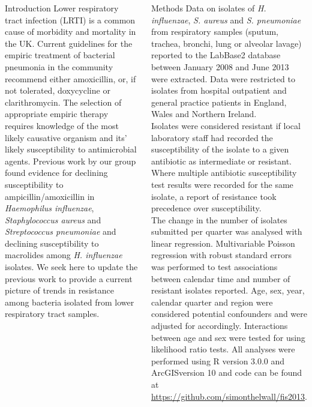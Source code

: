 \documentclass[final, 14pt]{beamer}
\begin{document}
\begin{frame}
\begin{columns}[t]
 \begin{minipage}[t]{.95\textwidth} %
  \begin{block}{Introduction}
  Lower respiratory tract infection (LRTI) is a common cause of morbidity and mortality in the UK. \citep{Davies2012}
   Current guidelines for the empiric treatment of bacterial pneumonia in the community recommend either amoxicillin, or, if not tolerated, doxycycline or clarithromycin. \citep{Lim2009}
   The selection of appropriate empiric therapy requires knowledge of the most likely causative organism and its' likely susceptibility to antimicrobial agents.
   Previous work by our group found evidence for declining susceptibility to ampicillin/amoxicillin in \textit{Haemophilus influenzae}, \textit{Staphylococcus aureus} and \textit{Streptococcus pneumoniae} and declining susceptibility to macrolides among \textit{H. influenzae} isolates. \citep{Blackburn2011}
   We seek here to update the previous work to provide a current picture of trends in resistance among bacteria isolated from lower respiratory tract samples. \\
   \end{block}
  
  \begin{block}{Methods}
Data on isolates of \textit{H. influenzae}, \textit{S. aureus} and \textit{S. pneumoniae} from respiratory samples (sputum, trachea, bronchi, lung or alveolar lavage) reported to the LabBase2 database between January 2008 and June 2013 were extracted. 
   Data were restricted to isolates from hospital outpatient and general practice patients in England, Wales and Northern Ireland.\\
   Isolates were considered resistant if local laboratory staff had recorded the susceptibility of the isolate to a given antibiotic as intermediate or resistant. 
   Where multiple antibiotic susceptibility test results were recorded for the same isolate, a report of resistance took precedence over susceptibility. \\
   The change in the number of isolates submitted per quarter was analysed with linear regression. 
   Multivariable Poisson regression with robust standard errors was performed to test associations between calendar time and number of resistant isolates reported.
   Age, sex, year, calendar quarter and region were considered potential confounders and were adjusted for accordingly.
   Interactions between age and sex were tested for using likelihood ratio tests. 
   All analyses were performed using R version 3.0.0 and ArcGIS\texttrademark version 10 and code can be found at \url{https://github.com/simonthelwall/fis2013}.
  \end{block}
  

\end{minipage}
\end{columns}
\end{frame}
\end{document}
